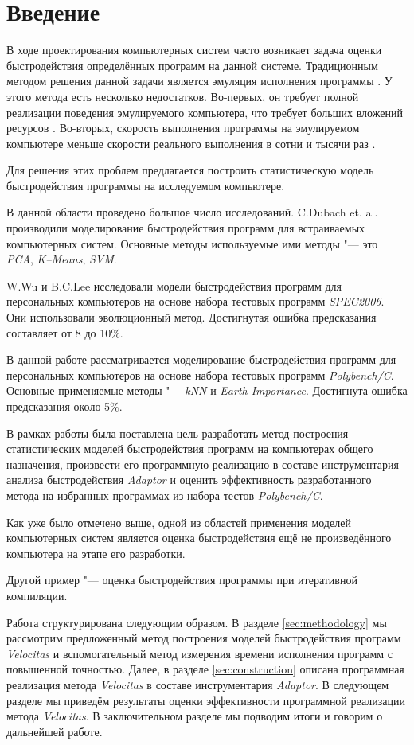 \section*{Введение}
В ходе проектирования компьютерных систем часто возникает задача оценки быстродействия определённых программ на данной системе. Традиционным методом решения данной задачи является эмуляция исполнения программы \cite{emulation}. У этого метода есть несколько недостатков. Во-первых, он требует полной реализации поведения эмулируемого компьютера, что требует больших вложений ресурсов \cite{emulation-complexity}. Во-вторых, скорость выполнения программы на эмулируемом компьютере меньше скорости реального выполнения в сотни и тысячи раз \cite{emulation-speed,emulation-complexity}.

Для решения этих проблем предлагается построить статистическую модель быстродействия программы на исследуемом компьютере.

В данной области проведено большое число исследований. C.Dubach
et. al. \cite{Dubach:2009:PCO:1669112.1669124,Dubach:2008:EPA:1450095.1450103} производили моделирование быстродействия программ для встраиваемых компьютерных систем. Основные методы используемые ими методы "--- это \textit{PCA}, \textit{K--Means}, \textit{SVM}.

W.Wu и B.C.Lee \cite{Wu:2012:IMD:2457472.2457516} исследовали модели быстродействия программ для персональных компьютеров на основе набора тестовых программ \textit{SPEC2006}. Они использовали эволюционный метод. Достигнутая ошибка предсказания составляет от 8 до 10\%.

В данной работе рассматривается моделирование быстродействия программ для персональных компьютеров на основе набора тестовых программ \textit{Polybench/C}. Основные применяемые методы "--- \textit{kNN }и \textit{Earth Importance}. Достигнута ошибка предсказания около 5\%.

В рамках работы была поставлена цель разработать метод построения статистических моделей быстродействия программ на компьютерах общего назначения, произвести его программную реализацию в составе инструментария анализа быстродействия \textit{Adaptor} и оценить эффективность разработанного метода на избранных программах из набора тестов \textit{Polybench/C}.

Как уже было отмечено выше, одной из областей применения моделей компьютерных систем является оценка быстродействия ещё не произведённого компьютера на этапе его разработки.

Другой пример "--- оценка быстродействия программы при итеративной компиляции.

Работа структурирована следующим образом. В разделе \ref{sec:methodology} мы рассмотрим предложенный метод построения моделей быстродействия программ \textit{Velocitas} и вспомогательный метод измерения времени исполнения программ с повышенной точностью. Далее, в разделе \ref{sec:construction} описана программная реализация метода \textit{Velocitas} в составе инструментария \textit{Adaptor}. В следующем разделе мы приведём результаты оценки эффективности программной реализации метода \textit{Velocitas}. В заключительном разделе мы подводим итоги и говорим о дальнейшей работе.